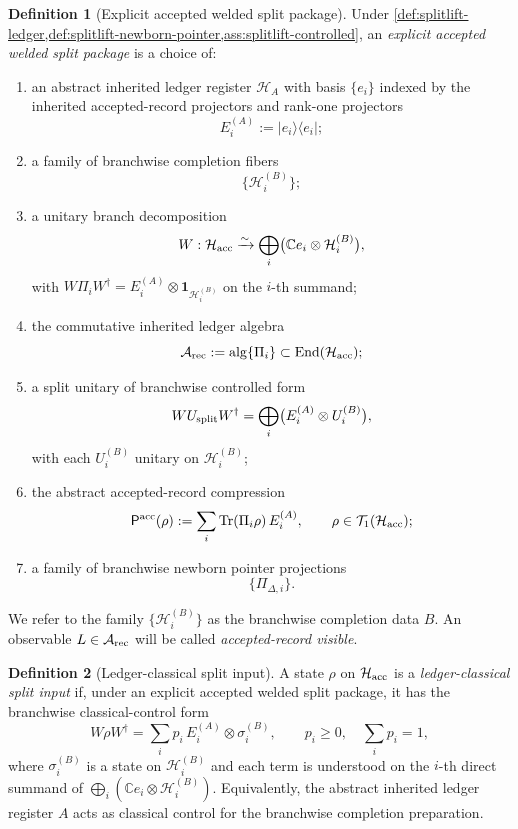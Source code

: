 \documentclass[11pt]{article}
\theoremstyle{definition}
\newtheorem{definition}{Definition}[section]
\theoremstyle{plain}
\theoremstyle{remark}
\newcommand{\Arec}{\mathcal A_{\rm rec}}
\newcommand{\Hacc}{\mathcal H_{\rm acc}}
\newcommand{\HA}{\mathcal H_A}
\newcommand{\Pacc}{\mathsf P^{\mathrm{acc}}}
\newcommand{\Tr}{\operatorname{Tr}}
\newcommand{\1}{\mathbf 1}
\begin{document}
\begin{definition}[Explicit accepted welded split package]
\label{def:splitlift-data}
Under
\cref{def:splitlift-ledger,def:splitlift-newborn-pointer,ass:splitlift-controlled},
an \emph{explicit accepted welded split package} is a choice of:
\begin{enumerate}[leftmargin=2em]
\item an abstract inherited ledger register \(\HA\) with basis \(\{e_i\}\) indexed by the
  inherited accepted-record projectors and rank-one projectors
  \[
  E_i^{(A)}:=|e_i\rangle\langle e_i|;
  \]
\item a family of branchwise completion fibers
  \[
  \{\mathcal H_i^{(B)}\};
  \]
\item a unitary branch decomposition
  \[
  W:\Hacc\xrightarrow{\sim}\bigoplus_i \bigl(\mathbb C e_i \otimes \mathcal H_i^{(B)}\bigr),
  \]
  with \(W\Pi_iW^\dagger=E_i^{(A)}\otimes \1_{\mathcal H_i^{(B)}}\) on the \(i\)-th summand;
\item the commutative inherited ledger algebra
  \[
  \Arec:=\mathrm{alg}\{\Pi_i\}\subset \operatorname{End}(\Hacc);
  \]
\item a split unitary of branchwise controlled form
  \[
  WU_{\rm split}W^\dagger
  =
  \bigoplus_i \bigl(E_i^{(A)}\otimes U_i^{(B)}\bigr),
  \]
  with each \(U_i^{(B)}\) unitary on \(\mathcal H_i^{(B)}\);
\item the abstract accepted-record compression
  \[
  \Pacc(\rho):=\sum_i \Tr(\Pi_i\rho)\,E_i^{(A)},
  \qquad
  \rho\in\mathcal T_1(\Hacc);
  \]
\item a family of branchwise newborn pointer projections
  \[
  \{\Pi_{\Delta,i}\}.
  \]
\end{enumerate}
We refer to the family \(\{\mathcal H_i^{(B)}\}\) as the branchwise completion data \(B\).
An observable \(L\in\Arec\) will be called \emph{accepted-record visible}.
\end{definition}

\begin{definition}[Ledger-classical split input]
\label{def:splitlift-ledger-classical}
A state \(\rho\) on \(\Hacc\) is a \emph{ledger-classical split input} if, under an explicit
accepted welded split package, it has the branchwise classical-control form
\[
W\rho W^\dagger
=
\sum_i p_i\,E_i^{(A)}\otimes \sigma_i^{(B)},
\qquad
p_i\ge 0,\quad \sum_i p_i=1,
\]
where \(\sigma_i^{(B)}\) is a state on \(\mathcal H_i^{(B)}\) and each term is understood on the
\(i\)-th direct summand of \(\bigoplus_i(\mathbb C e_i\otimes\mathcal H_i^{(B)})\).
Equivalently, the abstract inherited ledger register \(A\) acts as classical control for the
branchwise completion preparation.
\end{definition}
\end{document}
